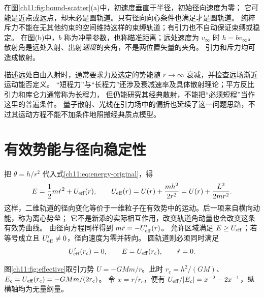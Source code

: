 在图\ref{ch11:fig:bound-scatter}(a)中，初速度垂直于半径，初始径向速度为零；
它可能是近点或远点，却未必是圆轨道。只有径向向心条件也满足才是圆轨道。
纯粹斥力不能在无其他约束的空间维持这样的束缚轨道；有引力也不自动保证束缚或稳定。
在图(b)中，$b$ 称为冲量参数，也称瞄准距离；远处速度为 $v_\infty$ 时 $h=bv_\infty$。
散射角是远处入射、出射\emph{速度}的夹角，不是两位置矢量的夹角。
引力和斥力均可造成散射。

描述远处自由入射时，通常要求力及选定的势能随 $r\to\infty$ 衰减，并检查远场渐近运动能否定义。
“短程力”与“长程力”还涉及衰减速率及具体散射理论；平方反比引力和库仑力通常称为长程力，
但仍能研究其经典散射，不能把“必须短程”当作这里的普遍条件。
量子散射、光线在引力场中的偏折也延续了这一问题思路，不过其运动方程不能不加条件地照搬经典质点模型。

\section{有效势能与径向稳定性}
\label{ch11:sec:effective}
把 $\dot\theta=h/r^2$ 代入式\eqref{ch11:eq:energy-original}，得
\begin{equation}\label{ch11:eq:effective}
 E=\frac12m\dot r^2+U_{\rm eff}(r),\qquad
 U_{\rm eff}(r)=U(r)+\frac{mh^2}{2r^2}=U(r)+\frac{L^2}{2mr^2}.
\end{equation}
这样，二维轨道的径向变化等价于一维粒子在有效势中的运动。后一项来自横向动能，称为离心势垒；
它不是新添的实际相互作用，改变轨道角动量也会改变这条有效势曲线。
由径向方程同样得到 $m\ddot r=-U_{\rm eff}'(r)$。
允许区域满足 $E\ge U_{\rm eff}$；若等号成立且 $U_{\rm eff}'\ne0$，径向速度为零并转向。
圆轨道则必须同时满足
\begin{equation}\label{ch11:eq:circle-condition}
 U_{\rm eff}'(r_c)=0,\qquad E=U_{\rm eff}(r_c),\qquad \dot r=0.
\end{equation}

图\ref{ch11:fig:effective}取引力势 $U=-GMm/r$。此时
$r_c=h^2/(GM)$、$E_c=U_{\rm eff}(r_c)=-GMm/(2r_c)$。
令 $x=r/r_c$，便有 $U_{\rm eff}/|E_c|=x^{-2}-2x^{-1}$，纵横轴均为无量纲量。

